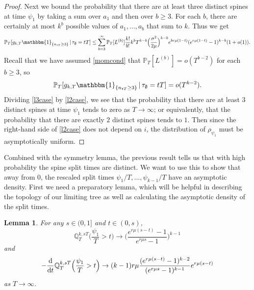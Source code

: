 \documentclass{article}
\theoremstyle{plain}
\newtheorem{lem}[thm]{Lemma}
\theoremstyle{definition}
\newcommand{\Q}{\mathbb{Q}}
\renewcommand{\P}{\mathbb{P}}
\newcommand{\ind}{\mathbbm{1}}
\renewcommand{\d}{{\rm{d}}}
\begin{document}
\begin{proof}
Next we bound the probability that there are at least three distinct spines at time $\psi_1$ by taking a sum over $a_1$ and then over $b\ge 3$. For each $b$, there are certainly at most $k^b$ possible values of $a_1,\ldots,a_b$ that sum to $k$. Thus we get
\[\P_T[g_{k,T} \ind_{\{n_{tT}\ge 3\}} \,|\, \tau_\emptyset = tT] \le \sum_{b=3}^\infty \P_T[L^{(b)}] \frac{k!}{b!} k^b T^{k-b}\Big(\frac{\sigma^2}{2\mu}\Big)^{k-b} e^{br\mu(1-t)}(e^{r\mu(1-t)}-1)^{k-b}(1+o(1)).\]
Recall that we have assumed \eqref{momcond} that $\P_T[L^{(b)}] = o(T^{b-2})$ for each $b\ge 3$, so
\begin{equation}\label{l3case}
\P_T[g_{k,T} \ind_{\{n_{tT}\ge 3\}} \,|\, \tau_\emptyset = tT] = o(T^{k-2}).
\end{equation}
Dividing \eqref{l3case} by \eqref{l2case}, we see that the probability that there are at least $3$ distinct spines at time $\psi_{1}$ tends to zero as $T\to\infty$; or equivalently, that the probability that there are exactly $2$ distinct spines tends to $1$. Then since the right-hand side of \eqref{l2case} does not depend on $i$, the distribution of $\rho_{\psi_1}$ must be asymptotically uniform.
\end{proof}

Combined with the symmetry lemma, the previous result tells us that with high probability the spine split times are distinct. We want to use this to show that away from $0$, the rescaled split times $\psi_1/T,\ldots,\psi_{k-1}/T$ have an asymptotic density. First we need a preparatory lemma, which will be helpful in describing the topology of our limiting tree as well as calculating the asymptotic density of the split times.

\begin{lem}\label{splitderiv}
For any $s\in(0,1]$ and $t\in(0,s)$,
\[\Q^{k,sT}_T\Big(\frac{\psi_1}{T}>t\Big) \to \Big(\frac{e^{r\mu(s-t)}-1}{e^{r\mu s}-1}\Big)^{k-1}\]
and
\[-\frac{\d}{\d t} \Q^{k,sT}_T\Big(\frac{\psi_1}{T} > t\Big) \to  (k-1)r\mu \frac{(e^{r\mu(s-t)}-1)^{k-2}}{(e^{r\mu s}-1)^{k-1}} e^{r\mu(s-t)}\]
as $T\to\infty$.
\end{lem}
\end{document}
